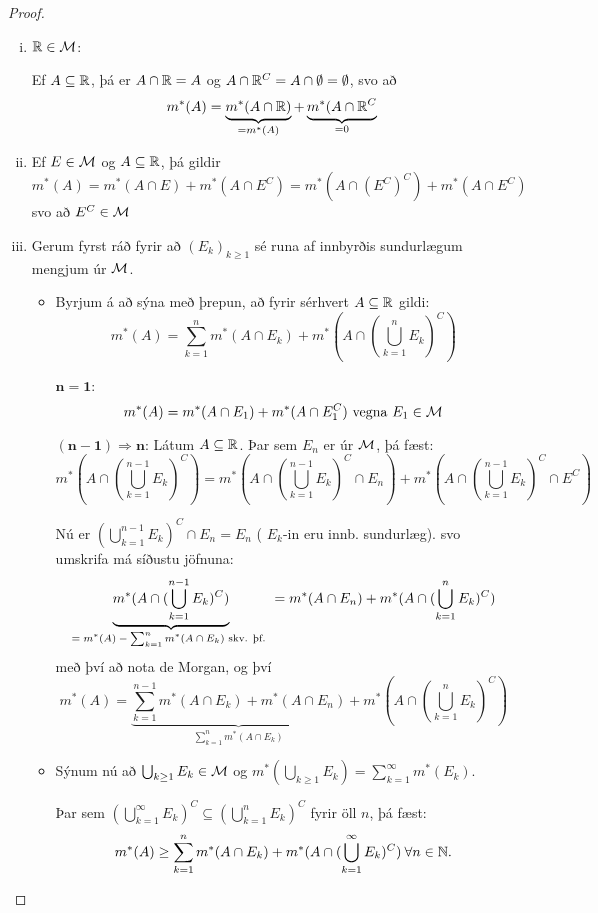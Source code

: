 \documentclass[12pt]{book} \usepackage[utf8]{inputenc}
\begin{document}
\begin{proof}
  \begin{enumerate}[(i)]
  \item $\mathbb{R} \in \mathcal{M} $:

    Ef $A \subseteq \mathbb{R}$, þá er $A \cap \mathbb{R} = A$ og
    $A \cap \mathbb{R}^C = A \cap \emptyset = \emptyset$, svo að
    \[ m^*(A) = \underbrace{m^*(A \cap \mathbb{R})}_{= m^*(A)} +
    \underbrace{m^*(A\cap \mathbb{R}^C}_{= 0}\]
  \item Ef $E \in \mathcal{M}$ og $A \subseteq \mathbb{R}$, þá gildir
    \[ m^*(A) = m^*(A \cap E) + m^*(A \cap E^C) = m^*(A \cap (
    E^C)^C) + m^*(A \cap E^C) \] svo að $E^C \in \mathcal{M}$
  \item Gerum fyrst ráð fyrir að $(E_k)_{k \geq 1}$ sé runa af
    innbyrðis sundurlægum mengjum úr $\mathcal{M}$.

    \begin{itemize}
    \item Byrjum á að sýna með þrepun, að fyrir sérhvert
      $A \subseteq \mathbb{R}$ gildi:
      \[ m^*(A) = \sum_{k=1}^n m^*(A \cap E_k) + m^*(A \cap
      (\bigcup_{k=1}^n E_k)^C) \]

      $\mathbf{n = 1}$:
      \[m^*(A) = m^*(A \cap E_1) + m^*(A \cap E_1^C) \text{ vegna
      } E_1 \in \mathcal{M} \]


      $\mathbf{(n-1) \Rightarrow n}$: Látum $A \subseteq \mathbb{R}$. Þar
      sem $E_n$ er úr $\mathcal{M}$, þá fæst:
      \[ m^*(A \cap (\bigcup_{k=1}^{n-1} E_k)^C) = m^*(A \cap
      (\bigcup_{k=1}^{n-1} E_k)^C \cap E_n) + m^*(A \cap
      (\bigcup_{k=1}^{n-1} E_k)^C \cap E^C) \]

      Nú er $(\bigcup_{k=1}^{n-1} E_k)^C \cap E_n = E_n$ (
      $E_k$-in eru innb. sundurlæg).  svo umskrifa má síðustu
      jöfnuna:
      \[ \underbrace{m^*(A \cap (\bigcup_{k=1}^{n-1}
        E_k)^C)}_{\text{$= m^*(A) - \sum_{k=1}^n m^*(A \cap
        E_k)$ skv. þf. }} = m^*(A \cap E_n) + m^*(A \cap
      (\bigcup_{k=1}^{n} E_k)^C ) \]
      með því að nota de Morgan, og því
      \[ m^*(A) = \underbrace{\sum_{k=1}^{n-1} m^*(A \cap E_k) +
        m^*(A \cap E_n)}_{\sum_{k=1}^{n} m^*(A\cap E_k)} + m^*(A
      \cap (\bigcup_{k=1}^{n} E_k)^C) \]
    \item Sýnum nú að $\bigcup_{k \geq 1} E_k \in \mathcal{M}$ og
      $m^*(\bigcup_{k \geq 1} E_k) = \sum_{k=1}^{\infty}
      m^*(E_k)$.

      Þar sem
      $(\bigcup_{k=1}^{\infty} E_k)^C \subseteq (\bigcup_{k=1}^n
      E_k)^C$ fyrir öll $n$, þá fæst:
      \[ m^*(A) \geq \sum_{k=1}^n m^*(A \cap E_k) + m^*(A \cap
      (\bigcup_{k=1}^{\infty} E_k)^C) \: \forall n \in \mathbb{N}. \]


\end{itemize}
\end{enumerate}
\end{proof}
\end{document}
